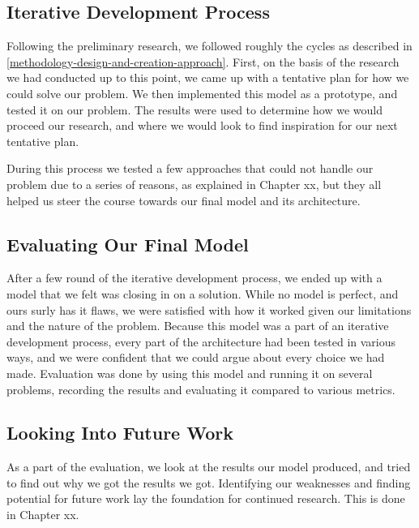 \subsection{Iterative Development Process}
Following the preliminary research, we followed roughly the cycles as described in \ref{methodology-design-and-creation-approach}. First, on the basis of the research we had conducted up to this point, we came up with a tentative plan for how we could solve our problem. We then implemented this model as a prototype, and tested it on our problem. The results were used to determine how we would proceed our research, and where we would look to find inspiration for our next tentative plan.

During this process we tested a few approaches that could not handle our problem due to a series of reasons, as explained in Chapter xx, but they all helped us steer the course towards our final model and its architecture.

\subsection{Evaluating Our Final Model}
After a few round of the iterative development process, we ended up with a model that we felt was closing in on a solution. While no model is perfect, and ours surly has it flaws, we were satisfied with how it worked given our limitations and the nature of the problem. Because this model was a part of an iterative development process, every part of the architecture had been tested in various ways, and we were confident that we could argue about every choice we had made. Evaluation was done by using this model and running it on several problems, recording the results and evaluating it compared to various metrics.

\subsection{Looking Into Future Work}
As a part of the evaluation, we look at the results our model produced, and tried to find out why we got the results we got. Identifying our weaknesses and finding potential for future work lay the foundation for continued research. This is done in Chapter xx.